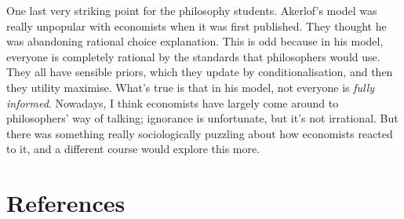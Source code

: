\documentclass[
  11pt,
  letterpaper,
]{scrbook}
\begin{document}
One last very striking point for the philosophy students. Akerlof's
model was really unpopular with economists when it was first published.
They thought he was abandoning rational choice explanation. This is odd
because in his model, everyone is completely rational by the standards
that philosophers would use. They all have sensible priors, which they
update by conditionalisation, and then they utility maximise. What's
true is that in his model, not everyone is \emph{fully informed}.
Nowadays, I think economists have largely come around to philosophers'
way of talking; ignorance is unfortunate, but it's not irrational. But
there was something really sociologically puzzling about how economists
reacted to it, and a different course would explore this more.


\chapter*{References}\label{references}

\end{document}
